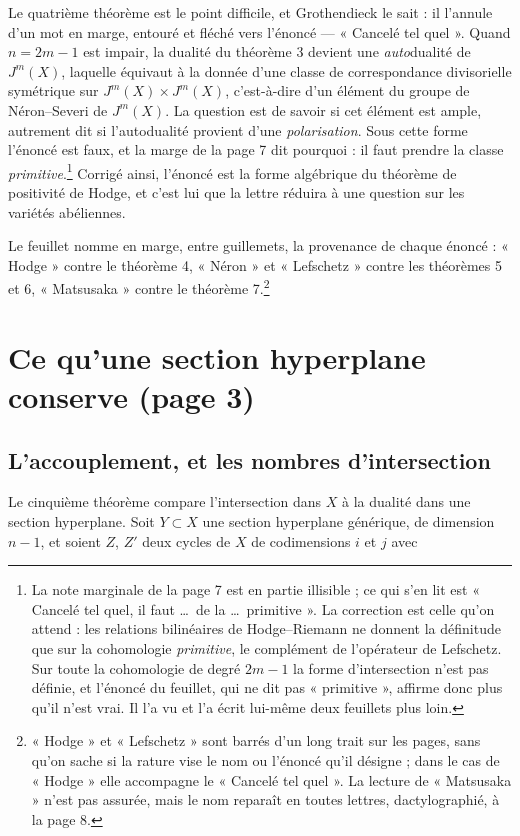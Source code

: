 \documentclass[11pt,a4paper]{article}
\begin{document}
Le quatrième théorème est le point difficile, et Grothendieck le sait : il
l'annule d'un mot en marge, entouré et fléché vers l'énoncé — « Cancelé tel
quel ». Quand $n = 2m-1$ est impair, la dualité du théorème 3 devient une
\emph{auto}dualité de $J^{m}(X)$, laquelle équivaut à la donnée d'une classe de
correspondance divisorielle symétrique sur $J^{m}(X)\times J^{m}(X)$,
c'est-à-dire d'un élément du groupe de Néron--Severi de $J^{m}(X)$. La question
est de savoir si cet élément est ample, autrement dit si l'autodualité provient
d'une \emph{polarisation}. Sous cette forme l'énoncé est faux, et la marge de la
page 7 dit pourquoi : il faut prendre la classe \emph{primitive}.\footnote{La
note marginale de la page 7 est en partie illisible ; ce qui s'en lit est
« Cancelé tel quel, il faut \ldots\ de la \ldots\ primitive ». La correction
est celle qu'on attend : les relations bilinéaires de Hodge--Riemann ne donnent
la définitude que sur la cohomologie \emph{primitive}, le complément de
l'opérateur de Lefschetz. Sur toute la cohomologie de degré $2m-1$ la forme
d'intersection n'est pas définie, et l'énoncé du feuillet, qui ne dit pas
« primitive », affirme donc plus qu'il n'est vrai. Il l'a vu et l'a écrit
lui-même deux feuillets plus loin.} Corrigé ainsi, l'énoncé est la forme
algébrique du théorème de positivité de Hodge, et c'est lui que la lettre
réduira à une question sur les variétés abéliennes.

Le feuillet nomme en marge, entre guillemets, la provenance de chaque énoncé :
« Hodge » contre le théorème 4, « Néron » et « Lefschetz » contre les théorèmes
5 et 6, « Matsusaka » contre le théorème 7.\footnote{« Hodge » et « Lefschetz »
sont barrés d'un long trait sur les pages, sans qu'on sache si la rature vise
le nom ou l'énoncé qu'il désigne ; dans le cas de « Hodge » elle accompagne le
« Cancelé tel quel ». La lecture de « Matsusaka » n'est pas assurée, mais le
nom reparaît en toutes lettres, dactylographié, à la page 8.}

\section*{Ce qu'une section hyperplane conserve (page 3)}

\subsection*{L'accouplement, et les nombres d'intersection}

Le cinquième théorème compare l'intersection dans $X$ à la dualité dans une
section hyperplane. Soit $Y \subset X$ une section hyperplane générique, de
dimension $n-1$, et soient $Z$, $Z'$ deux cycles de $X$ de codimensions $i$ et
$j$ avec
\end{document}
